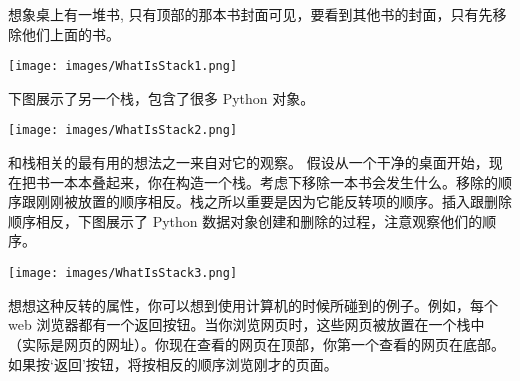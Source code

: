 \documentclass[9pt]{beamer}
\begin{document}
\begin{frame}\ft{\subsecname}
\begin{testexample} 
想象桌上有一堆书, 只有顶部的那本书封面可见，要看到其他书的封面，只有先移除他们上面的书。

\centering
\texttt{[image: images/WhatIsStack1.png]}
\end{testexample}
        
        
\end{frame}

\begin{frame}\ft{\subsecname}
\begin{testexample} 
下图展示了另一个栈，包含了很多 Python 对象。

\centering
\texttt{[image: images/WhatIsStack2.png]}
\end{testexample}       
\end{frame}

\begin{frame}\ft{\subsecname}
\begin{testexample} 
和栈相关的最有用的想法之一来自对它的观察。
假设从一个干净的桌面开始，现在把书一本本叠起来，你在构造一个栈。考虑下移除一本书会发生什么。移除的顺序跟刚刚被放置的顺序相反。栈之所以重要是因为它能反转项的顺序。插入跟删除顺序相反，下图展示了 Python 数据对象创建和删除的过程，注意观察他们的顺序。

\centering
\texttt{[image: images/WhatIsStack3.png]}
\end{testexample}
\end{frame}

\begin{frame}\ft{\subsecname}
\begin{testexample} 
想想这种反转的属性，你可以想到使用计算机的时候所碰到的例子。例如，每个 web 浏览器都有一个返回按钮。当你浏览网页时，这些网页被放置在一个栈中（实际是网页的网址）。你现在查看的网页在顶部，你第一个查看的网页在底部。如果按‘返回’按钮，将按相反的顺序浏览刚才的页面。
\end{testexample}

\end{frame}
\end{document}
